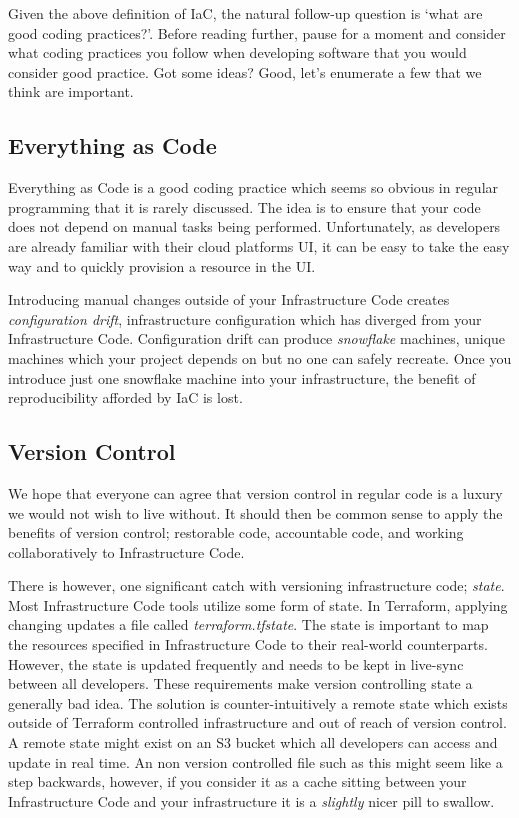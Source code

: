 Given the above definition of IaC,
the natural follow-up question is 
`what are good coding practices?'.
Before reading further,
pause for a moment and consider what coding practices you follow when developing software that you would consider good practice.
Got some ideas? Good, let's enumerate a few that we think are important.

\subsection{Everything as Code}
Everything as Code is a good coding practice which seems so obvious in regular programming that it is rarely discussed.
The idea is to ensure that your code does not depend on manual tasks being performed.
Unfortunately, as developers are already familiar with their cloud platforms UI,
it can be easy to take the easy way and to quickly provision a resource in the UI.

Introducing manual changes outside of your Infrastructure Code creates \textsl{configuration drift}, infrastructure configuration which has diverged from your Infrastructure Code.
Configuration drift can produce \textsl{snowflake} machines,
unique machines which your project depends on but no one can safely recreate.
Once you introduce just one snowflake machine into your infrastructure,
the benefit of reproducibility afforded by IaC is lost.

\subsection{Version Control}
We hope that everyone can agree that version control in regular code is a luxury we would not wish to live without.
It should then be common sense to apply the benefits of version control;
restorable code, accountable code, and working collaboratively to Infrastructure Code.

There is however, one significant catch with versioning infrastructure code; \textsl{state}.
Most Infrastructure Code tools utilize some form of state.
In Terraform, applying changing updates a file called \textsl{terraform.tfstate}.
The state is important to map the resources specified in Infrastructure Code to their real-world counterparts.
However, the state is updated frequently and needs to be kept in live-sync between all developers.
These requirements make version controlling state a generally bad idea.
The solution is counter-intuitively a remote state which exists outside of Terraform controlled infrastructure and out of reach of version control.
A remote state might exist on an S3 bucket which all developers can access and update in real time.
An non version controlled file such as this might seem like a step backwards,
however, if you consider it as a cache sitting between your Infrastructure Code and your infrastructure it is a \textsl{slightly} nicer pill to swallow.

